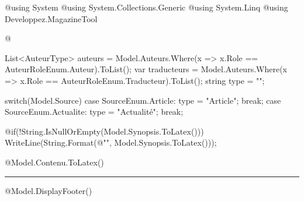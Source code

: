 @using System
@using System.Collections.Generic
@using System.Linq
@using Developpez.MagazineTool

@{
	List<AuteurType> auteurs = Model.Auteurs.Where(x => x.Role == AuteurRoleEnum.Auteur).ToList();
	var traducteurs = Model.Auteurs.Where(x => x.Role == AuteurRoleEnum.Traducteur).ToList();
	string type = "";

	switch(Model.Source)
	{
		case SourceEnum.Article:
			type = "Article";
			break;
		case SourceEnum.Actualite:
			type = "Actualité";
			break;
	}
}
\begin{sloppypar}
\label{article-@Model.ID}
\end{sloppypar}

@if(!String.IsNullOrEmpty(Model.Synopsis.ToLatex()))
{
	WriteLine(String.Format(@"", Model.Synopsis.ToLatex()));
}


@Model.Contenu.ToLatex()

\begin{center}
\rule{\linewidth}{.5pt}
\end{center}

@Model.DisplayFooter()
